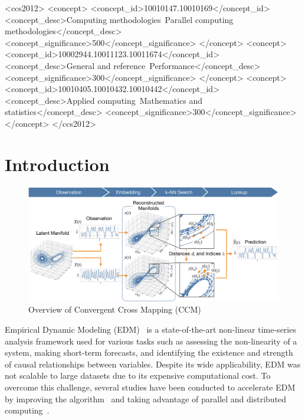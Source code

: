 \documentclass[sigconf]{acmart}
\begin{document}

\begin{CCSXML}
<ccs2012>
   <concept>
       <concept_id>10010147.10010169</concept_id>
       <concept_desc>Computing methodologies~Parallel computing methodologies</concept_desc>
       <concept_significance>500</concept_significance>
       </concept>
   <concept>
       <concept_id>10002944.10011123.10011674</concept_id>
       <concept_desc>General and reference~Performance</concept_desc>
       <concept_significance>300</concept_significance>
       </concept>
   <concept>
       <concept_id>10010405.10010432.10010442</concept_id>
       <concept_desc>Applied computing~Mathematics and statistics</concept_desc>
       <concept_significance>300</concept_significance>
       </concept>
 </ccs2012>
\end{CCSXML}


\maketitle

\section{Introduction}

\begin{figure}
    \centering
    \includegraphics[width=\linewidth]{figs/xmap_overview}
    \caption{Overview of Convergent Cross Mapping (CCM)}\label{fig:edm}
\end{figure}

Empirical Dynamic Modeling (EDM)~\cite{Chang2017} is a state-of-the-art
non-linear time-series analysis framework used for various tasks such as
assessing the non-linearity of a system, making short-term forecasts, and
identifying the existence and strength of causal relationships between
variables. Despite its wide applicability, EDM was not scalable to large
datasets due to its expensive computational cost. To overcome this challenge,
several studies have been conducted to accelerate EDM by improving the
algorithm~\cite{Ma2014} and taking advantage of parallel and distributed
computing~\cite{Pu2019}.
\end{document}
